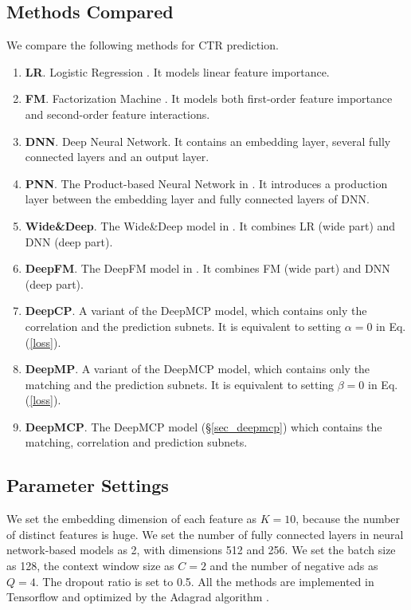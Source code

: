 \documentclass{article}
\begin{document}
\subsection{Methods Compared}
We compare the following methods for CTR prediction.
\begin{enumerate} \item \textbf{LR}. Logistic Regression \cite{richardson2007predicting}. It models linear feature importance.
\item \textbf{FM}. Factorization Machine \cite{rendle2010factorization}. It models both first-order feature importance and second-order feature interactions.
\item \textbf{DNN}. Deep Neural Network. It contains an embedding layer, several fully connected layers and an output layer.
\item \textbf{PNN}. The Product-based Neural Network in \cite{qu2016product}. It introduces a production layer between the embedding layer and fully connected layers of DNN.
\item \textbf{Wide\&Deep}. The Wide\&Deep model in \cite{cheng2016wide}. It combines LR (wide part) and DNN (deep part).
\item \textbf{DeepFM}. The DeepFM model in \cite{guo2017deepfm}. It combines FM (wide part) and DNN (deep part).
\item \textbf{DeepCP}. A variant of the DeepMCP model, which contains only the correlation and the prediction subnets. It is equivalent to setting $\alpha = 0$ in Eq. (\ref{loss}).
\item \textbf{DeepMP}. A variant of the DeepMCP model, which contains only the matching and the prediction subnets. It is equivalent to setting $\beta=0$ in Eq. (\ref{loss}).
\item \textbf{DeepMCP}. The DeepMCP model (\S\ref{sec_deepmcp}) which contains the matching, correlation and prediction subnets.
\end{enumerate}

\subsection{Parameter Settings}
We set the embedding dimension of each feature as $K=10$, because the number of distinct features is huge.
We set the number of fully connected layers in neural network-based models as 2, with dimensions 512 and 256. We set the batch size as 128, the context window size as $C=2$ and the number of negative ads as $Q=4$.
The dropout ratio is set to 0.5. All the methods are implemented in Tensorflow and optimized by the Adagrad algorithm \cite{duchi2011adaptive}.
\end{document}
